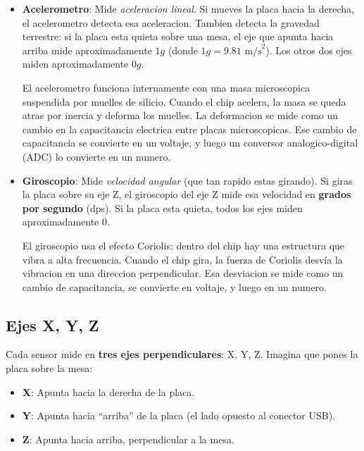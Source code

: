 \documentclass[11pt,a4paper]{article}
\begin{document}
\begin{itemize}
    \item \textbf{Acelerometro}: Mide \emph{aceleracion lineal}. Si
          mueves la placa hacia la derecha, el acelerometro detecta
          esa aceleracion. Tambien detecta la gravedad terrestre: si
          la placa esta quieta sobre una mesa, el eje que apunta
          hacia arriba mide aproximadamente $1g$ (donde
          $1g = 9.81 \text{ m/s}^2$). Los otros dos ejes miden
          aproximadamente $0g$.

          El acelerometro funciona internamente con una masa
          microscopica suspendida por muelles de silicio. Cuando
          el chip acelera, la masa se queda atras por inercia y
          deforma los muelles. La deformacion se mide como un
          cambio en la capacitancia electrica entre placas
          microscopicas. Ese cambio de capacitancia se convierte
          en un voltaje, y luego un conversor analogico-digital
          (ADC) lo convierte en un numero.

    \item \textbf{Giroscopio}: Mide \emph{velocidad angular}
          (que tan rapido estas girando). Si giras la placa sobre
          su eje Z, el giroscopio del eje Z mide esa velocidad
          en \textbf{grados por segundo} (dps). Si la placa esta
          quieta, todos los ejes miden aproximadamente 0.

          El giroscopio usa el efecto Coriolis: dentro del chip hay
          una estructura que vibra a alta frecuencia. Cuando el chip
          gira, la fuerza de Coriolis desvía la vibracion en una
          direccion perpendicular. Esa desviacion se mide como un
          cambio de capacitancia, se convierte en voltaje, y luego
          en un numero.
\end{itemize}

\subsection{Ejes X, Y, Z}

Cada sensor mide en \textbf{tres ejes perpendiculares}: X, Y, Z.
Imagina que pones la placa sobre la mesa:

\begin{itemize}
    \item \textbf{X}: Apunta hacia la derecha de la placa.
    \item \textbf{Y}: Apunta hacia ``arriba'' de la placa (el lado
          opuesto al conector USB).
    \item \textbf{Z}: Apunta hacia arriba, perpendicular a la mesa.
\end{itemize}
\end{document}
